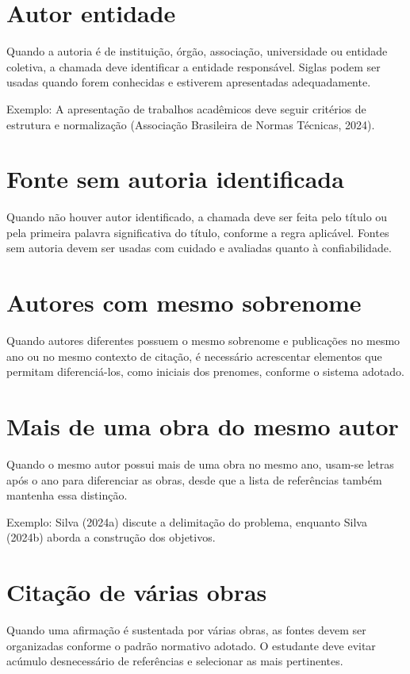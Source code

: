 \section{Autor entidade}

Quando a autoria é de instituição, órgão, associação, universidade ou entidade coletiva, a chamada deve identificar a entidade responsável. Siglas podem ser usadas quando forem conhecidas e estiverem apresentadas adequadamente.

Exemplo: A apresentação de trabalhos acadêmicos deve seguir critérios de estrutura e normalização (Associação Brasileira de Normas Técnicas, 2024).

\section{Fonte sem autoria identificada}

Quando não houver autor identificado, a chamada deve ser feita pelo título ou pela primeira palavra significativa do título, conforme a regra aplicável. Fontes sem autoria devem ser usadas com cuidado e avaliadas quanto à confiabilidade.

\section{Autores com mesmo sobrenome}

Quando autores diferentes possuem o mesmo sobrenome e publicações no mesmo ano ou no mesmo contexto de citação, é necessário acrescentar elementos que permitam diferenciá-los, como iniciais dos prenomes, conforme o sistema adotado.

\section{Mais de uma obra do mesmo autor}

Quando o mesmo autor possui mais de uma obra no mesmo ano, usam-se letras após o ano para diferenciar as obras, desde que a lista de referências também mantenha essa distinção.

Exemplo: Silva (2024a) discute a delimitação do problema, enquanto Silva (2024b) aborda a construção dos objetivos.

\section{Citação de várias obras}

Quando uma afirmação é sustentada por várias obras, as fontes devem ser organizadas conforme o padrão normativo adotado. O estudante deve evitar acúmulo desnecessário de referências e selecionar as mais pertinentes.

